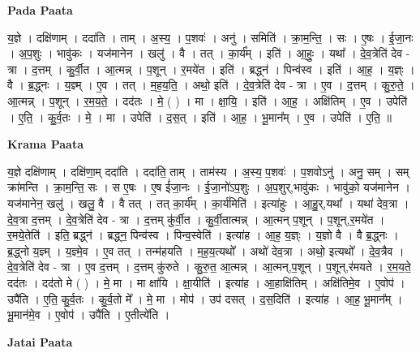 \documentclass[17pt]{extarticle}
\begin{document}
\textbf{Pada Paata} \newline

य॒ज्ञे । दक्षि॑णाम् । ददा॑ति । ताम् । अ॒स्य॒ । प॒शवः॑ । अनु॑ । समिति॑ । क्रा॒म॒न्ति॒ । सः । ए॒षः । ई॒जा॒नः । अ॒प॒शुः । भावु॑कः । यज॑मानेन । खलु॑ । वै । तत् । का॒र्य᳚म् । इति॑ । आ॒हुः॒ । यथा᳚ । दे॒व॒त्रेति॑ देव - त्रा । द॒त्तम् । कु॒र्वी॒त । आ॒त्मन्न् । प॒शून् । र॒मये॑त । इति॑ । ब्रद्ध्न॑ । पिन्व॑स्व । इति॑ । आ॒ह॒ । य॒ज्ञ्ः । वै । ब्र॒द्ध्नः । य॒ज्ञ्म् । ए॒व । तत् । म॒ह॒य॒ति॒ । अथो॒ इति॑ । दे॒व॒त्रेति॑ देव - त्रा । ए॒व । द॒त्तम् । कु॒रु॒ते॒ । आ॒त्मन्न् । प॒शून् । र॒म॒य॒ते॒ । दद॑तः । मे॒ ( ) । मा । क्षा॒यि॒ । इति॑ । आ॒ह॒ । अक्षि॑तिम् । ए॒व । उपेति॑ । ए॒ति॒ । कु॒र्व॒तः । मे॒ । मा । उपेति॑ । द॒स॒त् । इति॑ । आ॒ह॒ । भू॒मान᳚म् । ए॒व । उपेति॑ । ए॒ति॒ ॥  \newline


\textbf{Krama Paata} \newline

य॒ज्ञे दक्षि॑णाम् । दक्षि॑णा॒म् ददा॑ति । ददा॑ति॒ ताम् । ताम॑स्य । अ॒स्य॒ प॒शवः॑ । प॒शवोऽनु॑ । अनु॒ सम् । सम् क्रा॑मन्ति । क्रा॒म॒न्ति॒ सः । स ए॒षः । ए॒ष ई॑जा॒नः । ई॒जा॒नो॑ऽप॒शुः । अ॒प॒शुर्,भावु॑कः । भावु॑को॒ यज॑मानेन । यज॑मानेन॒ खलु॑ । खलु॒ वै । वै तत् । तत् का॒र्य᳚म् । का॒र्य॑मिति॑ । इत्या॑हुः । आ॒हु॒र्,यथा᳚ । यथा॑ देव॒त्रा । दे॒व॒त्रा द॒त्तम् । दे॒व॒त्रेति॑ देव - त्रा । द॒त्तम् कु॑र्वी॒त । कु॒र्वी॒तात्मन्न् । आ॒त्मन् प॒शून् । प॒शून्,र॒मये॑त । र॒मये॒तेति॑ । इति॒ ब्रद्ध्न॑ । ब्रद्ध्न॒ पिन्व॑स्व । पिन्व॒स्वेति॑ । इत्या॑ह । आ॒ह॒ य॒ज्ञ्ः । य॒ज्ञो वै । वै ब्र॒द्ध्नः । ब्र॒द्ध्नो य॒ज्ञ्म् । य॒ज्ञ्मे॒व । ए॒व तत् । तन्म॑हयति । म॒ह॒य॒त्यथो᳚ । अथो॑ देव॒त्रा । अथो॒ इत्यथो᳚ । दे॒व॒त्रैव । दे॒व॒त्रेति॑ देव - त्रा । ए॒व द॒त्तम् । द॒त्तम् कु॑रुते । कु॒रु॒त॒ आ॒त्मन्न् । आ॒त्मन्,प॒शून् । प॒शून्,र॑मयते । र॒म॒य॒ते॒ दद॑तः । दद॑तो मे ( ) । मे॒ मा । मा क्षा॑यि । क्षा॒यीति॑ । इत्या॑ह । आ॒हाक्षि॑तिम् । अक्षि॑तिमे॒व । ए॒वोप॑ । उपै॑ति । ए॒ति॒ कु॒र्व॒तः । कु॒र्व॒तो मे᳚ । मे॒ मा । मोप॑ । उप॑ दसत् । द॒स॒दिति॑ । इत्या॑ह । आ॒ह॒ भू॒मान᳚म् । भू॒मान॑मे॒व । ए॒वोप॑ । उपै॑ति । ए॒तीत्ये॑ति । \newline

\textbf{Jatai Paata} \newline
\end{document}
